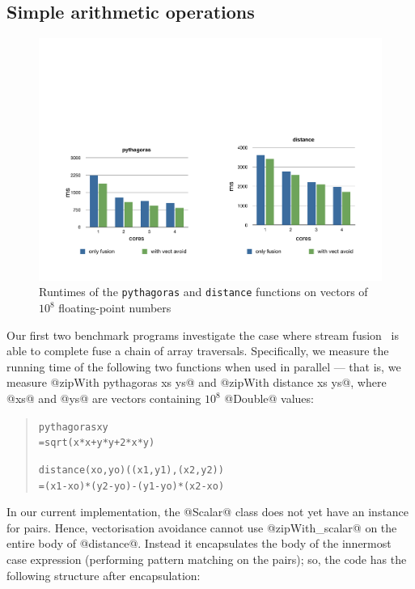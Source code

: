 \subsection{Simple arithmetic operations}
\label{sec:simple-arith}

\begin{figure}
\includegraphics[scale=0.6, trim=0cm 2cm 0cm 8cm, clip]{data/DistancePythagoras.pdf}
\caption{Runtimes of the \texttt{pythagoras} and \texttt{distance} functions on vectors of $10^8$ floating-point numbers}
\label{Figure:distancePythagoras}
\end{figure}
%
Our first two benchmark programs investigate the case where stream fusion~\cite{coutts:rewriting-strings, coutts:stream-fusion} is able to complete fuse a chain of array traversals. Specifically, we measure the running time of the following two functions when used in parallel --- that is, we measure @zipWith pythagoras xs ys@ and @zipWith distance xs ys@, where @xs@ and @ys@ are vectors containing $10^8$ @Double@ values:
%
\begin{quote}\small
\begin{alltt}
pythagoras x y
  = sqrt (x * x + y * y + 2 * x * y)

distance (xo, yo) ((x1, y1), (x2, y2))
  = (x1 - xo) * (y2 - yo) - (y1 - yo) * (x2 - xo)
\end{alltt}
\end{quote}
%
In our current implementation, the @Scalar@ class does not yet have an instance for pairs. Hence, vectorisation avoidance cannot use @zipWith_scalar@ on the entire body of @distance@. Instead it encapsulates the body of
the innermost case expression (performing pattern matching on the pairs); so, the code has the following structure after encapsulation:
